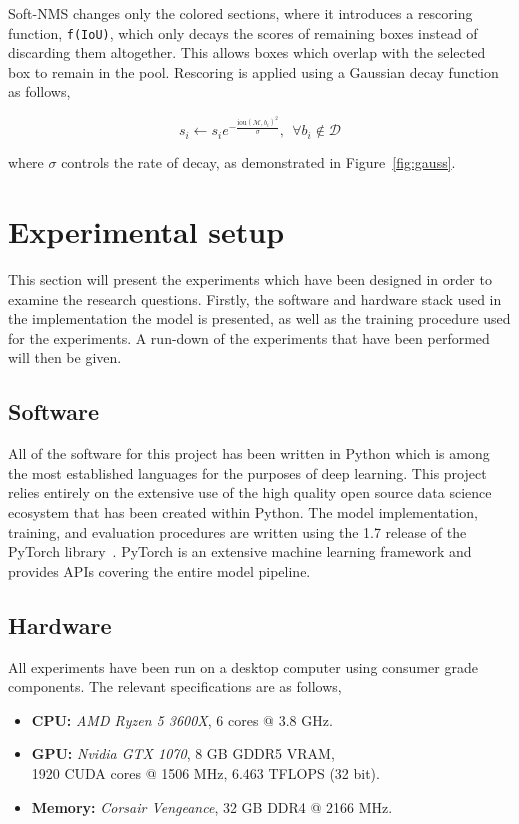 Soft-NMS changes only the colored sections, where it introduces a rescoring function, \texttt{f(IoU)}, which only decays the scores of remaining boxes instead of discarding them altogether. %
This allows boxes which overlap with the selected box to remain in the pool.
Rescoring is applied using a Gaussian decay function as follows,

\[s_i\leftarrow s_i e^{-\frac{\text{iou}{(\mathcal{M}, b_i)}^2}{\sigma}},~~\forall b_i \notin \mathcal{D}\]

where \( \sigma \) controls the rate of decay, as demonstrated in Figure~\ref{fig:gauss}.

\section{Experimental setup}\label{sec:method-exp-setup}
This section will present the experiments which have been designed in order to examine the research questions.
Firstly, the software and hardware stack used in the implementation the model is presented, as well as the training procedure used for the experiments.
A run-down of the experiments that have been performed will then be given.

\subsection{Software}
All of the software for this project has been written in Python which is among the most established languages for the purposes of deep learning.
This project relies entirely on the extensive use of the high quality open source data science ecosystem that has been created within Python.
The model implementation, training, and evaluation procedures are written using the 1.7 release of the PyTorch library\ \parencite{NEURIPS2019_9015}.
PyTorch is an extensive machine learning framework and provides APIs covering the entire model pipeline.

\subsection{Hardware}
All experiments have been run on a desktop computer using consumer grade components.
The relevant specifications are as follows,
\begin{itemize}
  \item \textbf{CPU:} \textit{AMD Ryzen 5 3600X}, 6 cores @ 3.8 GHz.
  \item \textbf{GPU:} \textit{Nvidia GTX 1070}, 8 GB GDDR5 VRAM,\\1920 CUDA cores @ 1506 MHz, 6.463 TFLOPS (32 bit).
  \item \textbf{Memory:} \textit{Corsair Vengeance}, 32 GB DDR4 @ 2166 MHz.
\end{itemize}

